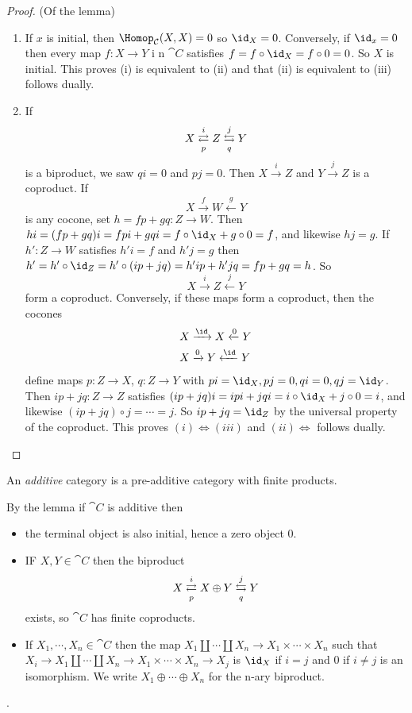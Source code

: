 \documentclass[../main.tex]{subfiles}
\begin{document}
\begin{proof}(Of the lemma)
	\begin{enumerate}
    	\item If $x$ is initial, then $\Hom_{\cat C}(X, X) = 0$ so $\id_X = 0$.
		Conversely, if $\id_x = 0$ then every map $f: X \to Y$ i n $\cat C$ satisfies $f = f \circ \id_X = f \circ 0 = 0$. So $X$ is initial. This proves (i) is equivalent to (ii) and that (ii) is equivalent to (iii) follows dually.
		\item If \[X \xrightleftarrows{i}[p] Z \xleftrightarrows{j}[q] Y\] is a biproduct, we saw $qi = 0$ and $pj = 0$. Then $X \xrightarrow{i} Z$ and $Y \xrightarrow{j} Z$ is a coproduct. If \[X \xrightarrow{f} W \xleftarrow{g} Y\] is any cocone, set $h = fp + gq: Z \to W$. Then $hi = (fp + gq)i = fpi + gqi = f \circ \id_X + g \circ 0 = f$, and likewise $hj = g$. If $h': Z \to W$ satisfies $h'i = f$ and $h'j = g$ then $h' = h' \circ \id_Z = h' \circ (ip + jq) = h'ip + h'jq = fp + gq = h$. So \[X \xrightarrow{i} Z \xleftarrow{j} Y\] form a coproduct. Conversely, if these maps form a coproduct, then the cocones 
		\begin{align*}
        	&X \xrightarrow{\id} X \xleftarrow{0} Y\\
			&X \xrightarrow{0} Y \xleftarrow{\id} Y			
        \end{align*}
		 define maps $p: Z \to X$, $q: Z \to Y$ with $pi = \id_X, pj = 0, qi = 0, qj = \id_Y$. Then $ip + jq: Z \to Z$ satisfies $(ip + jq)i = ipi + jqi = i \circ \id_X + j \circ 0 = i$, and likewise $(ip + jq)\circ j = \cdots = j$. So $ip + jq = \id_Z$ by the universal property of the coproduct. This proves $(i) \Leftrightarrow (iii)$ and $(ii) \Leftrightarrow$ follows dually.
    \end{enumerate}
\end{proof}
\begin{defn}
	An \emph{additive} category is a pre-additive category with finite products.
\end{defn}
\begin{rmk}
	By the lemma  if $\cat C$ is additive then
	\begin{itemize}
    	\item the terminal object is also initial, hence a zero object $0$.
		\item IF $X, Y \in \cat C$ then the biproduct \[X \xrightleftarrows{i}[p] X \oplus Y \xleftrightarrows{j}[q] Y\] exists, so $\cat C$ has finite coproducts.
		\item If $X_1, \cdots, X_n \in \cat C$ then the map $X_1 \coprod \cdots \coprod X_n \to X_1 \times \cdots \times X_n$ such that $X_i \to X_1 \coprod \cdots \coprod X_n \to X_1 \times \cdots \times X_n \to X_j$ is $\id_X$ if $i = j$ and $0$ if $i \neq j$ is an isomorphism. We write $X_1 \oplus \cdots \oplus X_n$ for the n-ary biproduct.
    \end{itemize}

\end{rmk}
\begin{exc}
	.
\end{exc}
\end{document}
